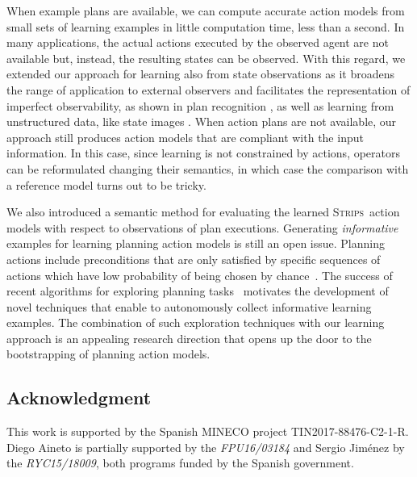 \documentclass[3p,times]{elsarticle}
\newcommand{\strips}{\textsc{Strips}}     %
\begin{document}
When example plans are available, we can compute accurate action models from small sets of learning examples in little computation time, less than a second. In many applications, the actual actions executed by the observed agent are not available but, instead, the resulting states can be observed. With this regard, we extended our approach for learning also from state observations as it broadens the range of application to external observers and facilitates the representation of imperfect observability, as shown in plan recognition \cite{SohrabiRU16}, as well as learning from unstructured data, like state images \cite{AsaiF18}. When action plans are not available, our approach still produces action models that are compliant with the input information. In this case, since learning is not constrained by actions, operators can be reformulated changing their semantics, in which case the comparison with a reference model turns out to be tricky.

We also introduced a semantic method for evaluating the learned \strips\ action models with respect to observations of plan executions. Generating {\em informative} examples for learning planning action models is still an open issue. Planning actions include preconditions that are only satisfied by specific sequences of actions which have low probability of being chosen by chance~\cite{fern2004learning}. The success of recent algorithms for exploring planning tasks~\cite{FrancesRLG17} motivates the development of novel techniques that enable to autonomously collect informative learning examples. The combination of such exploration techniques with our learning approach is an appealing research direction that opens up the door to the bootstrapping of planning action models.


\subsection*{Acknowledgment}
This work is supported by the Spanish MINECO project TIN2017-88476-C2-1-R. Diego Aineto is partially supported by the {\it FPU16/03184} and Sergio Jim\'enez by the {\it RYC15/18009}, both programs funded by the Spanish government.












\end{document}
